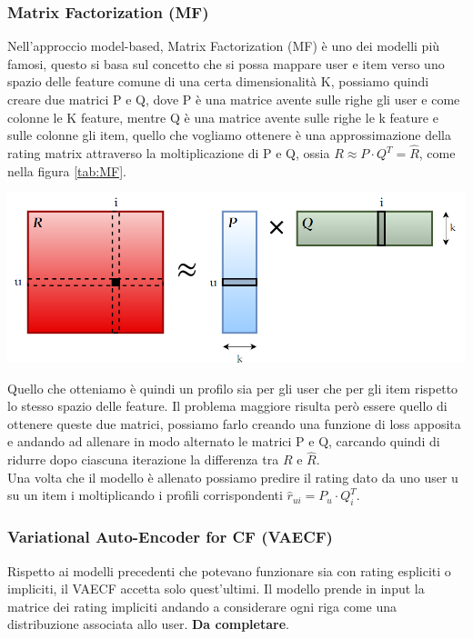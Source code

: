 \subsubsection{Matrix Factorization (MF)}
Nell'approccio model-based, Matrix Factorization (MF) è uno dei modelli più famosi, questo si basa sul concetto che si possa mappare user e item verso uno spazio delle feature comune di una certa dimensionalità K, possiamo quindi creare due matrici P e Q, dove P è una matrice avente sulle righe gli user e come colonne le K feature, mentre Q è una matrice avente sulle righe le k feature e sulle colonne gli item, quello che vogliamo ottenere è una approssimazione della rating matrix attraverso la moltiplicazione di P e Q, ossia $R \approx P \cdot Q^{T} = \hat{R}$, come nella figura \ref{tab:MF}.\\
\begin{center}
	\includegraphics[width=14.5cm]{figures/MF_disegno}
	\label{tab:MF}
\end{center}
Quello che otteniamo è quindi un profilo sia per gli user che per gli item rispetto lo stesso spazio delle feature. Il problema maggiore risulta però essere quello di ottenere queste due matrici, possiamo farlo creando una funzione di loss apposita e andando ad allenare in modo alternato le matrici P e Q, carcando quindi di ridurre dopo ciascuna iterazione la differenza tra $R$ e $\hat{R}$.\\
Una volta che il modello è allenato possiamo predire il rating dato da uno user u su un item i moltiplicando i profili corrispondenti $\hat{r}_{ui} = P_u \cdot Q_{i}^{T}$.

\subsubsection{Variational Auto-Encoder for CF (VAECF)}
Rispetto ai modelli precedenti che potevano funzionare sia con rating espliciti o impliciti, il VAECF accetta solo quest'ultimi. Il modello prende in input la matrice dei rating impliciti andando a considerare ogni riga come una distribuzione associata allo user. \textbf{Da completare}.

